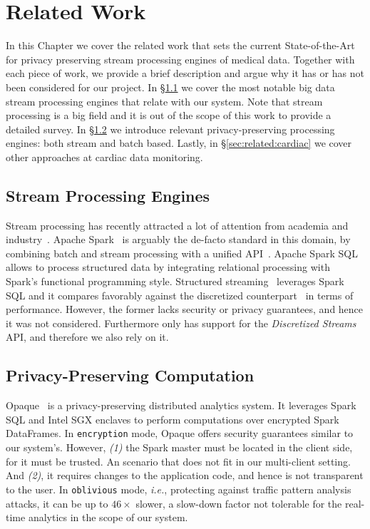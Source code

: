 \chapter{Related Work} \label{chap:related-work}

In this Chapter we cover the related work that sets the current State-of-the-Art for privacy preserving stream processing engines of medical data.
Together with each piece of work, we provide a brief description and argue why it has or has not been considered for our project.
In \S\ref{sec:related:stream} we cover the most notable big data stream processing engines that relate with our system.
Note that stream processing is a big field and it is out of the scope of this work to provide a detailed survey.
In \S\ref{sec:related:privacy} we introduce relevant privacy-preserving processing engines: both stream and batch based.
Lastly, in \S\ref{sec:related:cardiac} we cover other approaches at cardiac data monitoring.

\section{Stream Processing Engines} \label{sec:related:stream}

Stream processing has recently attracted a lot of attention from academia and industry~\cite{Koliousis2016,Miao2017,Venkataraman2017}.
Apache Spark~\cite{Zaharia2012} is arguably the de-facto standard in this domain, by combining batch and stream processing with a unified API~\cite{ZahariaDStreams2012}.
Apache Spark SQL~\cite{Armbrust2015} allows to process structured data by integrating relational processing with Spark's functional programming style.
Structured streaming~\cite{Armbrust2018} leverages Spark SQL and it compares favorably against the discretized counterpart~\cite{ZahariaDStreams2012} in terms of performance. %
However, the former lacks security or privacy guarantees, and hence it was not considered.
Furthermore \sgxspark only has support for the \textit{Discretized Streams} API, and therefore we also rely on it.

\section{Privacy-Preserving Computation} \label{sec:related:privacy}

Opaque~\cite{Zheng2017} is a privacy-preserving distributed analytics system.
It leverages Spark SQL and Intel SGX enclaves to perform computations over encrypted Spark DataFrames.
In \texttt{encryption} mode, Opaque offers security guarantees similar to our system's.
However, \emph{(1)} the Spark master must be located in the client side, for it must be trusted. 
An scenario that does not fit in our multi-client setting.
And \emph{(2)}, it requires changes to the application code, and hence is not transparent to the user.
In \texttt{oblivious} mode, \emph{i.e.}, protecting against traffic pattern analysis attacks, it can be up to $46\times$ slower, a slow-down factor not tolerable for the real-time analytics in the scope of our system.

